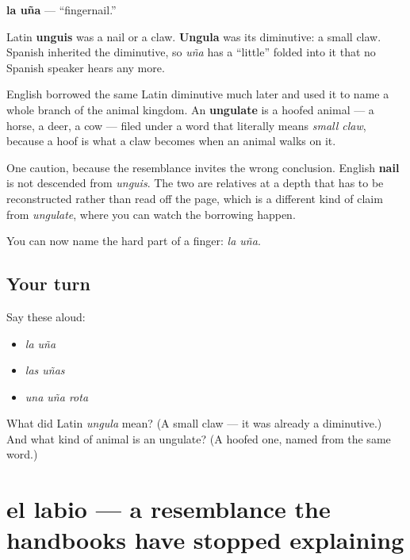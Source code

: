 \begin{cousinweb}
\textbf{la uña} — \textquotedblleft{}fingernail.\textquotedblright{}

Latin \textbf{unguis} was a nail or a claw. \textbf{Ungula} was its diminutive: a small claw. Spanish inherited the diminutive, so \emph{uña} has a \textquotedblleft{}little\textquotedblright{} folded into it that no Spanish speaker hears any more.

English borrowed the same Latin diminutive much later and used it to name a whole branch of the animal kingdom. An \textbf{ungulate} is a hoofed animal — a horse, a deer, a cow — filed under a word that literally means \emph{small claw}, because a hoof is what a claw becomes when an animal walks on it.

One caution, because the resemblance invites the wrong conclusion. English \textbf{nail} is not descended from \emph{unguis}. The two are relatives at a depth that has to be reconstructed rather than read off the page, which is a different kind of claim from \emph{ungulate}, where you can watch the borrowing happen.
\end{cousinweb}

\begin{grammarlens}[title={What you've built}]
You can now name the hard part of a finger: \emph{la uña}.
\end{grammarlens}

\subsection*{Your turn}
Say these aloud:

\begin{itemize}
\raggedright
  \item \emph{la uña}
  \item \emph{las uñas}
  \item \emph{una uña rota}
\end{itemize}

\begin{tcolorbox}[breakable,colback=teal!4,colframe=teal!35!black,title={Before you move on}]
What did Latin \emph{ungula} mean? (A small claw — it was already a diminutive.) And what kind of animal is an ungulate? (A hoofed one, named from the same word.)
\end{tcolorbox}
\section[el labio]{el labio — a resemblance the handbooks have stopped explaining}

